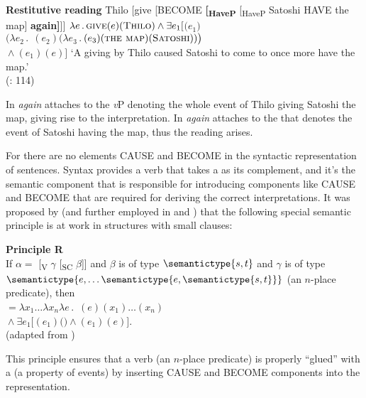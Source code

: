 \documentclass[output=paper]{langscibook}
\begin{document}
 \ea\label{ex:bondarenko:11}\textbf{Restitutive reading}
\ea Thilo [give [BECOME \textbf{[\textsubscript{HaveP}} [\textsubscript{HaveP} Satoshi HAVE the map] \textbf{again]}]]
\ex $\lambda e\,.\,\textsc{give}(e)(\textsc{Thilo})\wedge\exists e_1[$$\big(e_1\big)$\\
\tabto{1cm}$\big(\lambda e_2\,.\;$$\,(e_2)(\lambda e_3\,.\,$$(e_3)(\textsc{the map})(\textsc{Satoshi}))\big)$\\
\tabto{1cm}${}\wedge{}$$(e_1)(e)]$
\ex     `A giving by Thilo caused Satoshi to come to once more have the   map.'\\
\hfill(\citealt{Beck-Johnson2004}: 114)
\z
\z

\noindent In  \textit{again} attaches to the \textit{v}P denoting the whole event of Thilo giving Satoshi the map, giving rise to the  interpretation. In  \textit{again} attaches to the  that denotes the  event of Satoshi having the map, thus the  reading arises.



For \citet{Beck-Johnson2004} there are no elements CAUSE and BECOME in the syntactic representation of  sentences. Syntax provides a verb that takes a  as its complement, and it’s the semantic component that is responsible for introducing components like CAUSE and BECOME that are required for deriving the correct interpretations. It was proposed by \citet{vonStechow1995Lexicaldecompositionsyntax} (and further employed in \citealt{Beck-Johnson2004} and \citealt{Beck2005}) that the following special semantic principle is at work in structures with small clauses:


\ea \textbf{Principle R}\\
     If $\alpha ={}$ [\textsubscript{V} $\gamma$ [\textsubscript{SC} $\beta$]] and $\beta$ is of type $\semantictype{s,t}$ and $\gamma$ is of type $\semantictype{e,\dots\semantictype{e,\semantictype{s,t}}}$ (an $n$-place predicate), then\\\sx{$\alpha$}${}=\lambda x_1\dots\lambda x_n\lambda e\,.\,$ \sx{$\gamma $}$(e)(x_1)\dots(x_n)$\\
     \tabto{1cm}${}\wedge\exists e_1[$$(e_1)($\sx{$\beta$}$)\wedge{}$$(e_1)(e)]$.\\
     \hfill (adapted from \citealt[7]{Beck2005})
     \z


\noindent This principle ensures that a verb (an $n$-place predicate) is properly “glued” with a  (a property of events) by inserting CAUSE and BECOME components into the  representation.
\end{document}
